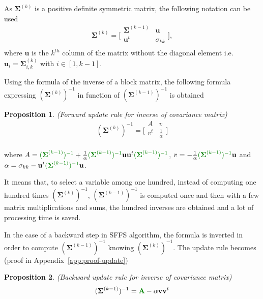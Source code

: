 \documentclass[journal,peerreview,onecolumn]{IEEEtran}
\newtheorem{prop}{Proposition}
\begin{document}
        As $\boldsymbol{\Sigma}^{(k)}$ is a positive definite symmetric matrix, the following notation can be used
        \begin{equation*}
            \boldsymbol{\Sigma}^{(k)} =
            \bigg[\begin{array}{cc}
            \boldsymbol{\Sigma}^{(k-1)} & \mathbf{u}      \\
            \mathbf{u}^t          & \sigma_{kk} \\
            \end{array}\bigg],
        \end{equation*}
        where $\mathbf{u}$ is the $k^{th}$ column of the matrix without the diagonal element i.e. $\mathbf{u}_{i} = \boldsymbol{\Sigma}^{(k)}_{i,k}$ with $i \in [1,k-1]$.

        Using the formula of the inverse of a block matrix, the following formula expressing $(\boldsymbol{\Sigma}^{(k)})^{-1}$ in function of $(\boldsymbol{\Sigma}^{(k-1)})^{-1}$ is obtained
        \begin{prop}
        \label{eq:update-inv}
            (Forward update rule for inverse of covariance matrix)
            \begin{equation*}
                (\boldsymbol{\Sigma}^{(k)})^{-1} =
                \bigg[\begin{array}{cc}
                A & v \\
                v^t  & \frac{1}{\alpha} \\
                \end{array}\bigg]
            \end{equation*}
        \end{prop}
        where $A = \textcolor[rgb]{0,0.5,0}{(\boldsymbol{\Sigma}^{(k-1)})^{-1}} + \frac{1}{\alpha} \textcolor[rgb]{0,0.5,0}{(\boldsymbol{\Sigma}^{(k-1)})^{-1}} \mathbf{u} \mathbf{u}^t \textcolor[rgb]{0,0.5,0}{(\boldsymbol{\Sigma}^{(k-1)})^{-1}}$, $v = - \frac{1}{\alpha} \textcolor[rgb]{0,0.5,0}{(\boldsymbol{\Sigma}^{(k-1)})^{-1}} \mathbf{u}$ and $ \alpha = \sigma_{kk} - \mathbf{u}^t \textcolor[rgb]{0,0.5,0}{(\boldsymbol{\Sigma}^{(k-1)})^{-1}} \mathbf{u}$.

        It means that, to select a variable among one hundred, instead of computing one hundred times $(\boldsymbol{\Sigma}^{(k)})^{-1}$, $(\boldsymbol{\Sigma}^{(k-1)})^{-1}$ is computed once and then with a few matrix multiplications and sums, the hundred inverses are obtained and a lot of processing time is saved.

        In the case of a backward step in SFFS algorithm, the formula is inverted in order to compute $(\boldsymbol{\Sigma}^{(k-1)})^{-1}$ knowing $(\boldsymbol{\Sigma}^{(k)})^{-1}$. The update rule becomes (proof in Appendix~\ref{app:proof-update})
        \begin{prop}
        \label{eq:update-inv-back}
            (Backward update rule for inverse of covariance matrix)
            \begin{equation*}
                (\boldsymbol{\Sigma}^{(k-1)})^{-1} = \textcolor[rgb]{0,0.5,0}{\mathbf{A}} - \alpha \mathbf{v} \mathbf{v}^t
            \end{equation*}
        \end{prop}
\end{document}
